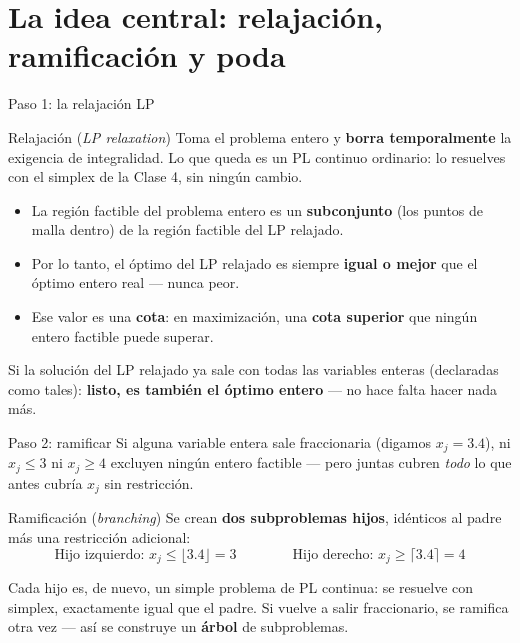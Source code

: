 \documentclass[aspectratio=169]{beamer}
\begin{document}
\section{La idea central: relajación, ramificación y poda}

\begin{frame}{Paso 1: la relajación LP}
\begin{block}{Relajación (\emph{LP relaxation})}
Toma el problema entero y \textbf{borra temporalmente} la exigencia de integralidad. Lo que queda es un PL continuo ordinario: lo resuelves con el simplex de la Clase 4, sin ningún cambio.
\end{block}

\begin{itemize}
\item La región factible del problema entero es un \textbf{subconjunto} (los puntos de malla dentro) de la región factible del LP relajado.
\item Por lo tanto, el óptimo del LP relajado es siempre \textbf{igual o mejor} que el óptimo entero real --- nunca peor.
\item Ese valor es una \textbf{cota}: en maximización, una \textbf{cota superior} que ningún entero factible puede superar.
\end{itemize}

Si la solución del LP relajado ya sale con todas las variables enteras (declaradas como tales): \textbf{listo, es también el óptimo entero} --- no hace falta hacer nada más.
\end{frame}

\begin{frame}{Paso 2: ramificar}
Si alguna variable entera sale fraccionaria (digamos $x_j=3.4$), ni $x_j\leq3$ ni $x_j\geq4$ excluyen ningún entero factible --- pero juntas cubren \emph{todo} lo que antes cubría $x_j$ sin restricción.

\begin{block}{Ramificación (\emph{branching})}
Se crean \textbf{dos subproblemas hijos}, idénticos al padre más una restricción adicional:
\[
\text{Hijo izquierdo: } x_j \leq \lfloor 3.4\rfloor = 3
\qquad\qquad
\text{Hijo derecho: } x_j \geq \lceil 3.4\rceil = 4
\]
\end{block}

Cada hijo es, de nuevo, un simple problema de PL continua: se resuelve con simplex, exactamente igual que el padre. Si vuelve a salir fraccionario, se ramifica otra vez --- así se construye un \textbf{árbol} de subproblemas.
\end{frame}
\end{document}
